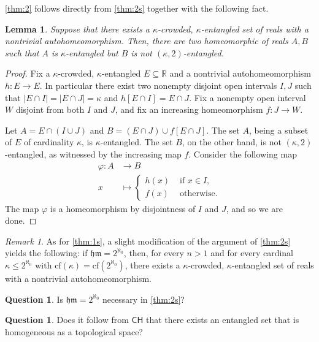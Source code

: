 \documentclass[12pt]{amsart}
\newtheorem{lemma}[theorem]{Lemma}
\theoremstyle{definition}
\newtheorem{question}[theorem]{Question}
\theoremstyle{remark}
\newtheorem{remark}[theorem]{Remark}
\begin{document}
\cref{thm:2} follows directly from \cref{thm:2s} together with the following fact.
\begin{lemma}\label{cor:2}
Suppose that there exists a $\kappa$-crowded, $\kappa$-entangled set of reals with a nontrivial autohomeomorphism. Then, there are two homeomorphic  of reals $A, B$ such that $A$ is $\kappa$-entangled but $B$ is not $(\kappa, 2)$-entangled.
\end{lemma}
\begin{proof}
Fix a $\kappa$-crowded, $\kappa$-entangled $E\subseteq \mathbb{R}$ and a nontrivial autohomeomorphism $h: E\rightarrow E$. In particular there exist two nonempty disjoint open intervals $I, J$ such that $|E \cap I| = |E \cap J| = \kappa$ and $h[E \cap I] = E \cap J$. Fix a nonempty open interval $W$ disjoint from both $I$ and $J$, and fix an increasing homeomorphism $f: J \rightarrow W$. 

Let $A = E \cap(I \cup J) $ and $B = (E \cap J) \cup f[E \cap J]$. The set $A$, being a subset of $E$ of cardinality $\kappa$, is $\kappa$-entangled. The set $B$, on the other hand, is not $(\kappa, 2)$-entangled, as witnessed by the increasing map $f$. Consider the following map
\begin{align*}
\varphi: A &\longrightarrow B\\
		x &\longmapsto \begin{cases}
		h(x) &\text{ if } x \in I,\\
		f(x) &\text{ otherwise.}
		\end{cases}
\end{align*}
The map $\varphi$ is a homeomorphism by disjointness of $I$ and $J$, and so we are done.
\end{proof}

\begin{remark}
As for \cref{thm:1s}, a slight modification of the argument of \cref{thm:2s} yields the following: if $\mathfrak{hm}= 2^{\aleph_0}$, then, for every $n > 1$ and for every cardinal $\kappa \le 2^{\aleph_0}$ with $\mathrm{cf}(\kappa) = \mathrm{cf}(2^{\aleph_0})$, there exists a $\kappa$-crowded, $\kappa$-entangled set of reals with a nontrivial autohomeomorphism.
\end{remark}

\begin{question}
Is $\mathfrak{hm} = 2^{\aleph_0}$ necessary in \cref{thm:2s}?
\end{question}

\begin{question}
Does it follow from $\mathsf{CH}$ that there exists an entangled set that is homogeneous as a topological space?
\end{question}
\end{document}
